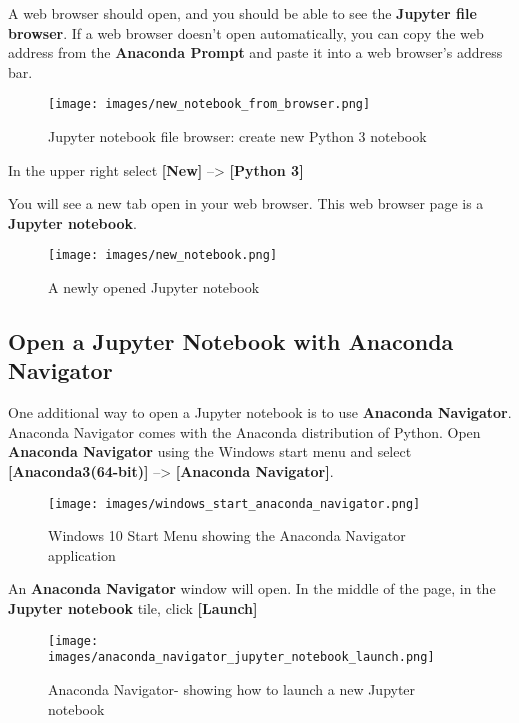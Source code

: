 \documentclass{book}
\makeatletter
\def\maxwidth{\ifdim\Gin@nat@width>\linewidth\linewidth
\else\Gin@nat@width\fi}
\let\Oldincludegraphics\includegraphics
\renewcommand{\includegraphics}[1]{\Oldincludegraphics[width=.8\maxwidth]{#1}}
\makeatother
\begin{document}
A web browser should open, and you should be able to see the
\textbf{Jupyter file browser}. If a web browser doesn't open
automatically, you can copy the web address from the \textbf{Anaconda
Prompt} and paste it into a web browser's address bar.

\begin{figure}
\centering
\texttt{[image: images/new\_notebook\_from\_browser.png]}
\caption{Jupyter notebook file browser: create new Python 3 notebook}
\end{figure}

In the upper right select \textbf{{[}New{]}} --\textgreater{}
\textbf{{[}Python 3{]}}

You will see a new tab open in your web browser. This web browser page
is a \textbf{Jupyter notebook}.

\begin{figure}
\centering
\texttt{[image: images/new\_notebook.png]}
\caption{A newly opened Jupyter notebook}
\end{figure}
    




    
        \hypertarget{open-a-jupyter-notebook-with-anaconda-navigator}{%
\subsection{Open a Jupyter Notebook with Anaconda
Navigator}\label{open-a-jupyter-notebook-with-anaconda-navigator}}
    




    
        One additional way to open a Jupyter notebook is to use \textbf{Anaconda
Navigator}. Anaconda Navigator comes with the Anaconda distribution of
Python. Open \textbf{Anaconda Navigator} using the Windows start menu
and select \textbf{{[}Anaconda3(64-bit){]}} --\textgreater{}
\textbf{{[}Anaconda Navigator{]}}.

\begin{figure}
\centering
\texttt{[image: images/windows\_start\_anaconda\_navigator.png]}
\caption{Windows 10 Start Menu showing the Anaconda Navigator
application}
\end{figure}

An \textbf{Anaconda Navigator} window will open. In the middle of the
page, in the \textbf{Jupyter notebook} tile, click \textbf{{[}Launch{]}}

\begin{figure}
\centering
\texttt{[image: images/anaconda\_navigator\_jupyter\_notebook\_launch.png]}
\caption{Anaconda Navigator- showing how to launch a new Jupyter
notebook}
\end{figure}
\end{document}
